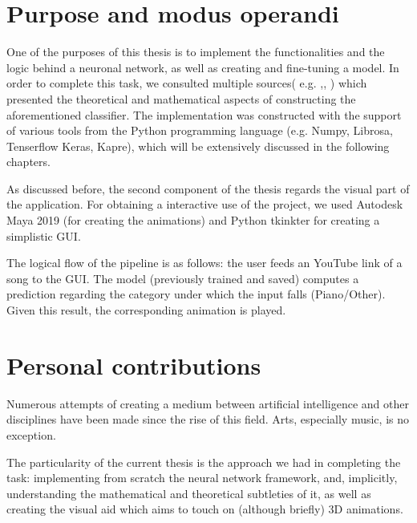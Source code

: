 	\section{Purpose and modus operandi}

	One of the purposes of this thesis is to implement the functionalities and the logic behind a neuronal network, as well as creating and fine-tuning a model. In order to complete this task, we consulted multiple sources( e.g. \cite{nnfs},\cite{DLFMIR},\cite{BACDNN} ) which presented the theoretical and mathematical aspects of constructing the aforementioned classifier. The implementation was constructed with the support of various tools from the Python programming language (e.g. Numpy, Librosa, Tenserflow Keras, Kapre), which will be extensively discussed in the following chapters.

	As discussed before, the second component of the thesis regards the visual part of the application. For obtaining a interactive use of the project, we used Autodesk Maya 2019 (for creating the animations) and Python tkinkter for creating a simplistic GUI.

	The logical flow of the pipeline is as follows: the user feeds an YouTube link of a song to the GUI. The model (previously trained and saved) computes a prediction regarding the category under which the input falls (Piano/Other). Given this result, the corresponding animation is played.

	\section{Personal contributions}


	Numerous attempts of creating a medium between artificial intelligence and other disciplines have been made since the rise of this field. Arts, especially music, is no exception.

	The particularity of the current thesis is the approach we had in completing the task: implementing from scratch the neural network framework, and, implicitly, understanding the mathematical and theoretical subtleties of it, as well as creating the visual aid which aims to touch on (although briefly) 3D animations.

